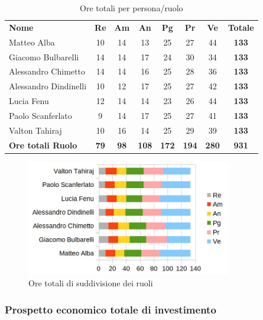 		\begin{table} [h!]
			\begin{center}
				\begin{tabular} { m{3.5cm} c c c c c c c }
					\rowcolor{lightgray}
					\textbf{Nome} & \textbf{Re} & \textbf{Am} & \textbf{An} & \textbf{Pg} & \textbf{Pr} & \textbf{Ve} & \textbf{Totale} \\
					Matteo Alba & 10 & 14 & 13 & 25 & 27 & 44 & \textbf{133} \\
					Giacomo Bulbarelli & 14 & 14 & 17 & 24 & 30 & 34 & \textbf{133} \\
					Alessandro Chimetto & 14 & 14 & 16 & 25 & 28 & 36 & \textbf{133} \\
					Alessandro Dindinelli & 10 & 12 & 17 & 25 & 27 & 42 & \textbf{133} \\
					Lucia Fenu & 12 & 14 & 14 & 23 & 26 & 44 & \textbf{133} \\
					Paolo Scanferlato & 9 & 14 & 17 & 25 & 27 & 41 & \textbf{133} \\
					Valton Tahiraj & 10 & 16 & 14 & 25 & 29 & 39 & \textbf{133} \\
					\textbf{Ore totali Ruolo} & \textbf{79} & \textbf{98} & \textbf{108} & \textbf{172} & \textbf{194}& \textbf{280} & \textbf{931}
				\end{tabular}
				\caption{Ore totali per persona/ruolo}
			\end{center}
		\end{table}
	
		\begin{figure} [h!]
			\centering
			\includegraphics[width=0.8\textwidth]{res/img/grafici/ore_totali_di_investimento.jpg}
			\caption{Ore totali di suddivisione dei ruoli} 
		\end{figure}
	
	\newpage
	
	\subsubsection{Prospetto economico totale di investimento}
	
